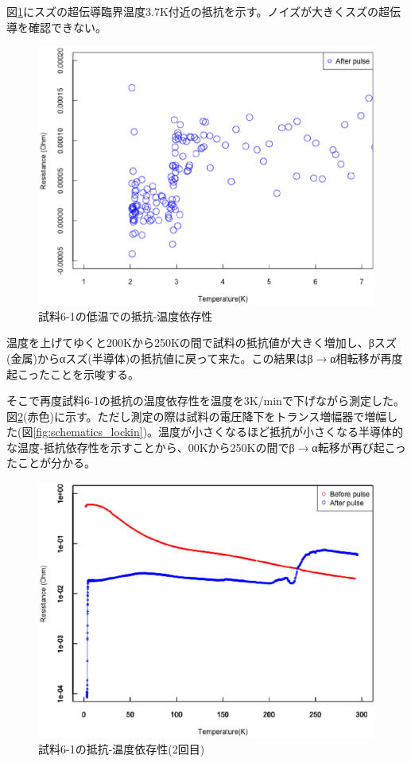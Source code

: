 図\ref{fig:181213_after_pulse2}にスズの超伝導臨界温度3.7K付近の抵抗を示す。ノイズが大きくスズの超伝導を確認できない。
\begin{figure}[!h]
    \begin{center}
   \includegraphics[width=0.7\hsize]{results_discussions/181213_after_pulse2.eps}
  \end{center}
  \caption{試料6-1の低温での抵抗-温度依存性}
  \label{fig:181213_after_pulse2}
  \end{figure}

温度を上げてゆくと200Kから250Kの間で試料の抵抗値が大きく増加し、βスズ(金属)からαスズ(半導体)の抵抗値に戻って来た。この結果はβ$\to$α相転移が再度起こったことを示唆する。

そこで再度試料6-1の抵抗の温度依存性を温度を3K/minで下げながら測定した。図\ref{fig:181228_before_after_pulse_log}(赤色)に示す。ただし測定の際は試料の電圧降下をトランス増幅器で増幅した(図\ref{fig:schematics_lockin})。温度が小さくなるほど抵抗が小さくなる半導体的な温度-抵抗依存性を示すことから、00Kから250Kの間でβ$\to$α転移が再び起こったことが分かる。
\begin{figure}[!h]
    \begin{center}
   \includegraphics[width=0.8\hsize]{results_discussions/181228_before_after_pulse_log.eps}
  \end{center}
  \caption{試料6-1の抵抗-温度依存性(2回目)}
  \label{fig:181228_before_after_pulse_log}
\end{figure}

